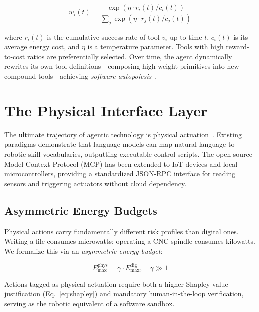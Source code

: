 \documentclass[11pt,a4paper]{article}
\begin{document}
\begin{equation}
    w_i(t) = \frac{\exp(\eta \cdot r_i(t) / c_i(t))}{\sum_j \exp(\eta \cdot r_j(t) / c_j(t))}
    \label{eq:skill_kernel}
\end{equation}

\noindent where $r_i(t)$ is the cumulative success rate of tool $v_i$ up to time $t$, $c_i(t)$ is its average energy cost, and $\eta$ is a temperature parameter. Tools with high reward-to-cost ratios are preferentially selected. Over time, the agent dynamically rewrites its own tool definitions---composing high-weight primitives into new compound tools---achieving \emph{software autopoiesis}~\citep{autopoiesis2026}.

\section{The Physical Interface Layer}
\label{sec:interface}

The ultimate trajectory of agentic technology is physical actuation~\citep{liang2023code, suchman1987plans}. Existing paradigms demonstrate that language models can map natural language to robotic skill vocabularies, outputting executable control scripts. The open-source Model Context Protocol (MCP) has been extended to IoT devices and local microcontrollers, providing a standardized JSON-RPC interface for reading sensors and triggering actuators without cloud dependency.

\subsection{Asymmetric Energy Budgets}

Physical actions carry fundamentally different risk profiles than digital ones. Writing a file consumes microwatts; operating a CNC spindle consumes kilowatts. We formalize this via an \emph{asymmetric energy budget}:

\begin{equation}
    E_{\max}^{\text{phys}} = \gamma \cdot E_{\max}^{\text{dig}}, \quad \gamma \gg 1
    \label{eq:asymmetric}
\end{equation}

\noindent Actions tagged as physical actuation require both a higher Shapley-value justification (Eq.~\ref{eq:shapley}) and mandatory human-in-the-loop verification, serving as the robotic equivalent of a software sandbox.
\end{document}
